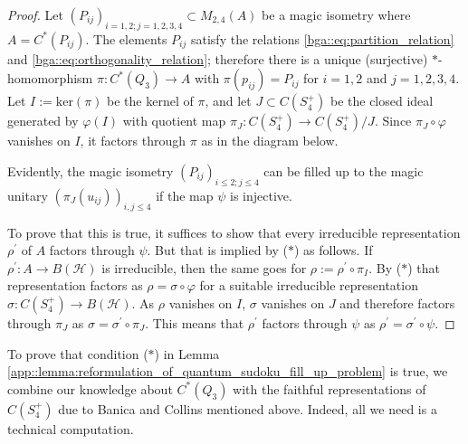 \documentclass[a4paper]{amsart}
\begin{document}
\begin{proof}
    Let $(P_{ij})_{i=1,2; j=1,2,3,4} \subset M_{2,4}(A)$ be a magic isometry where $A = C^\ast(P_{ij})$. The elements $P_{ij}$ satisfy the relations \eqref{bga::eq:partition_relation} and \eqref{bga::eq:orthogonality_relation}; therefore there is a unique (surjective) $\ast$-homomorphism $\pi: C^\ast(Q_3) \to A$ with $\pi(p_{ij}) = P_{ij}$ for $i=1,2$ and $j=1,2,3,4$. Let $I := \mathrm{ker}(\pi)$ be the kernel of $\pi$, and let $J \subset C(S_4^+)$ be the closed ideal generated by $\varphi(I)$ with quotient map $\pi_J: C(S_4^+) \to C(S_4^+) / J$. Since $\pi_J \circ \varphi$ vanishes on $I$, it factors through $\pi$ as in the diagram below.
    \begin{center}
    \end{center}   
    Evidently, the magic isometry $(P_{ij})_{i \leq 2; j \leq 4}$ can be filled up to the magic unitary $(\pi_J(u_{ij}))_{i,j \leq 4}$ if the map $\psi$ is injective.
 
    To prove that this is true, it suffices to show that every irreducible representation $\rho^\prime$ of $A$ factors through $\psi$. But that is implied by ($*$) as follows. If $\rho^\prime: A \to B(\mathcal{H})$ is irreducible, then the same goes for $\rho := \rho^\prime \circ \pi_I$. By ($*$) that representation factors as $\rho = \sigma \circ \varphi$ for a suitable irreducible representation $\sigma: C(S_4^+) \to B(\mathcal{H})$. As $\rho$ vanishes on $I$, $\sigma$ vanishes on $J$ and therefore factors through $\pi_J$ as $\sigma = \sigma^\prime \circ \pi_J$. This means that $\rho^\prime$ factors through $\psi$ as $\rho^\prime = \sigma^\prime \circ \psi$.
\end{proof}

To prove that condition ($\ast$) in Lemma \ref{app::lemma:reformulation_of_quantum_sudoku_fill_up_problem} is true, we combine our knowledge about $C^\ast(Q_3)$ with the faithful representations of $C(S_4^+)$ due to Banica and Collins mentioned above.
Indeed, all we need is a technical computation.
\end{document}
